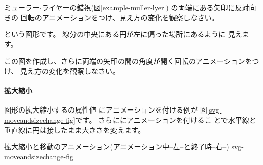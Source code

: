 \iffalse
これらの例では図形が画面に表示されるとすぐにアニメーションが始まります。
開始時間は\AttribA{begin}を用いて指定することができます。
\fi
\iffalse
\ProbwithSol{svg-bourdon-animation}{ブルドンの錯視(アニメーション付き)}
{svg-bourdon-animation}
{\keysubE{ブルドン}{錯視}{の}\IndexSet{ブルドンの錯視}{}{}{}{}(図
 \ref{bourdon})の錯視に回転のアニメーションをつけてどのように見え方が変わるか
 調べなさい。}
\fi
\begin{Problem}\upshape
 ミューラー$\cdot$ライヤーの錯視(図\ref{example-muller-lyer})
の両端にある矢印に反対向きの
回転のアニメーションをつけ、見え方の変化を観察しなさい。
\end{Problem}
{
という図形です。%
線分の中央にある円が左に偏った場所にあるように
 見えます。
\iffalse\begin{enumerate}
 \item この図を作成しなさい。
 \item 両端の矢印の間の角度が開く回転のアニメーションをつけ、
見え方の変化を観察しなさい。
\end{enumerate}
\else
この図を作成し、さらに両端の矢印の間の角度が開く回転のアニメーションをつけ、
見え方の変化を観察しなさい。%
\fi}
\paragraph{拡大縮小}
図形の拡大縮小するの属性値
にアニメーションを付ける例が
%
図\ref{svg-moveandsizechange-fig}です。%
さらににアニメーションを付けるこ
とで水平線と垂直線に円は接したまま大きさを変えます。

{拡大縮小と移動のアニメーション(アニメーション中--左--と終了時--右--)}
{svg-moveandsizechange-fig}

